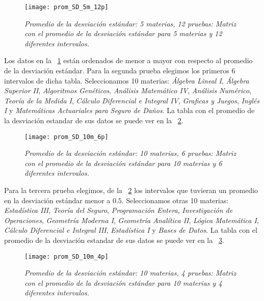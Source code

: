 \begin{figure}[H]
\centering
\texttt{[image: prom\_SD\_5m\_12p]} %
\caption[\textit{Promedio de la desviación estándar: 5 materias, 12 pruebas}]{\textit{Promedio de la desviación estándar: 5 materias, 12 pruebas: Matriz con el promedio de la desviación estándar para 5 materias y 12 diferentes intervalos.}}\label{promSD_5m_12p}
\end{figure}


Los datos en la \figurename{~\ref{promSD_5m_12p}} están ordenados de menor a mayor con respecto al promedio de la desviación estándar. Para la segunda prueba elegimos los primeros 6 intervalos de dicha tabla. Seleccionamos 10 materias: \textit{Álgebra Lineal I}, \textit{Álgebra Superior II}, \textit{Algoritmos Genéticos}, \textit{Análisis Matemático IV}, \textit{Análisis Numérico}, \textit{Teoría de la Medida I}, \textit{Cálculo Diferencial e Integral IV}, \textit{Graficas y Juegos}, \textit{Inglés I} y \textit{Matemáticas Actuariales para Seguro de Daños}. La tabla con el promedio de la desviación estandar de sus datos se puede ver en la \figurename{~\ref{promSD_10m_6p}}.


\begin{figure}[H]
\centering
\texttt{[image: prom\_SD\_10m\_6p]} %
\caption[\textit{Promedio de la desviación estándar: 10 materias, 6 pruebas}]{\textit{Promedio de la desviación estándar: 10 materias, 6 pruebas: Matriz con el promedio de la desviación estándar para 10 materias y 6 diferentes intervalos.}}\label{promSD_10m_6p}
\end{figure}


Para la tercera prueba elegimos, de la \figurename{~\ref{promSD_10m_6p}} los intervalos que tuvieran un promedio en la desviación estándar menor a $0.5$. Seleccionamos otras 10 materias: \textit{Estadística III}, \textit{Teoría del Seguro}, \textit{Programación Entera}, \textit{Investigación de Operaciones}, \textit{Geometría Moderna I}, \textit{Geometría Analítica II}, \textit{Lógica Matemática I}, \textit{Cálculo Diferencial e Integral III}, \textit{Estadística I} y \textit{Bases de Datos}. La tabla con el promedio de la desviación estandar de sus datos se puede ver en la \figurename{~\ref{promSD_10m_4p}}.


\begin{figure}[H]
\centering
\texttt{[image: prom\_SD\_10m\_4p]} %
\caption[\textit{Promedio de la desviación estándar: 10 materias, 4 pruebas}]{\textit{Promedio de la desviación estándar: 10 materias, 4 pruebas: Matriz con el promedio de la desviación estándar para 10 materias y 4 diferentes intervalos.}}\label{promSD_10m_4p}
\end{figure}

